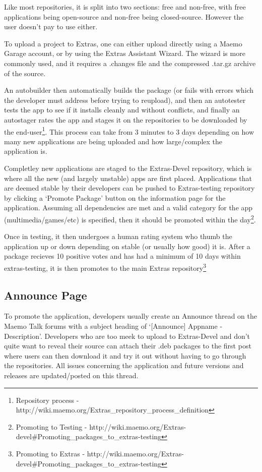 \documentclass[11pt]{article} %
\begin{document}
Like most repositories, it is split into two sections: free and non-free, with free applications being open-source and non-free being closed-source. However the user doesn’t pay to use either.

To upload a project to Extras, one can either upload directly using a Maemo Garage account, or by using the Extras Assistant Wizard. The wizard is more commonly used, and it requires a .changes file and the compressed .tar.gz archive of the source.

An autobuilder then automatically builds the package (or fails with errors which the developer must address before trying to reupload), and then an autotester tests the app to see if it installs cleanly and without conflicts, and finally an autostager rates the app and stages it on the repositories to be downloaded by the end-user\footnote{Repository process - http://wiki.maemo.org/Extras\_repository\_process\_definition}. This process can take from 3 minutes to 3 days depending on how many new applications are being uploaded and how large/complex the application is.

Completley new applications are staged to the Extras-Devel repository, which is where all the new (and largely unstable) apps are first placed. Applications that are deemed stable by their developers can be pushed to Extras-testing repository by clicking a ‘Promote Package’ button on the information page for the application. Assuming all dependencies are met and a valid category for the app (multimedia/games/etc) is specified, then it should be promoted within the day\footnote{Promoting to Testing  - http://wiki.maemo.org/Extras-devel\#Promoting\_packages\_to\_extras-testing}. 

Once in testing, it then undergoes a human rating system who thumb the application up or down depending on stable (or usually how good) it is. After a package recieves 10 positive votes and has had a minimum of 10 days within extras-testing, it is then promotes to the main Extras repository\footnote{Promoting to Extras - http://wiki.maemo.org/Extras-devel\#Promoting\_packages\_to\_extras-testing}

\subsection{Announce Page}
To promote the application, developers usually create an Announce thread on the Maemo Talk forums with a subject heading of ‘[Announce] Appname - Description’. Developers who are too meek to upload to Extras-Devel and don’t quite want to reveal their source can attach their .deb packages to the first post where users can then download it and try it out without having to go through the repositories. All issues concerning the application and future versions and releases are updated/posted on this thread.
\end{document}
